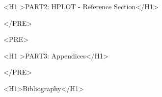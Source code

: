 <H1 >PART2: HPLOT - Reference Section</H1>


</PRE>


<PRE>


<H1 >PART3: Appendices</H1>


</PRE>
\begin{appendix}
\end{appendix}
\Filename{\BIBFILE}
<H1>Bibliography</H1>


